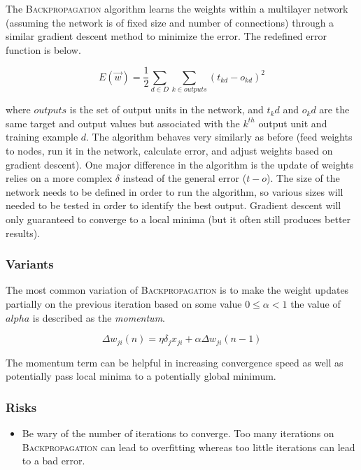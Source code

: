 \documentclass[titlepage,11pt]{article}
\begin{document}
The \textsc{Backpropagation} algorithm learns the weights within a multilayer network (assuming the network is of fixed size and number of connections) through a similar gradient descent method to minimize the error. The redefined error function is below.

\begin{equation}
E(\vec{w}) = \frac12 \sum_{d\in D} \sum_{k \in outputs}{(t_{kd} - o_{kd})^2}
\end{equation}

where $outputs$ is the set of output units in the network, and $t_kd$ and $o_kd$ are the same target and output values but associated with the $k^{th}$ output unit and training example $d$. The algorithm behaves very similarly as before (feed weights to nodes, run it in the network, calculate error, and adjust weights based on gradient descent). One major difference in the algorithm is the update of weights relies on a more complex $\delta$ instead of the general error ($t-o$). The size of the network needs to be defined in order to run the algorithm, so various sizes will needed to be tested in order to identify the best output. Gradient descent will only guaranteed to converge to a local minima (but it often still produces better results).

\subsubsection{Variants}

The most common variation of \textsc{Backpropagation} is to make the weight updates partially on the previous iteration based on some value $0 \leq \alpha < 1$ the value of $alpha$ is described as the \textit{momentum}.

\begin{equation}
\Delta w_{ji}(n)= \eta \delta_jx_{ji} +\alpha \Delta w_{ji} (n-1)
\end{equation}

The momentum term can be helpful in increasing convergence speed as well as potentially pass local minima to a potentially global minimum.

\subsubsection{Risks}

\begin{itemize}
\item Be wary of the number of iterations to converge. Too many iterations on \textsc{Backpropagation} can lead to overfitting whereas too little iterations can lead to a bad error.
\end{itemize}
\end{document}
